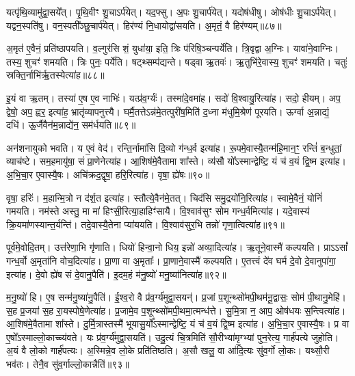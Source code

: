 यत्पृ॑थि॒व्यामु॑द्वा॒सये᳚त्। 
पृ॒थि॒वीꣳ शु॒चाऽर्प॑येत्। 
यद॒फ्सु। 
अ॒पः  शु॒चार्प॑येत्। 
यदोष॑धीषु। 
ओष॑धीः  शु॒चाऽर्प॑येत्। 
यद्वन॒स्पति॑षु। 
वन॒स्पती᳚ञ्छु॒चार्प॑येत्। 
हिर॑ण्यं नि॒धायोद्वा॑सयति। 
अ॒मृतं॒ वै हिर॑ण्यम्॥८७॥

अ॒मृत॑ ए॒वैनं॒ प्रति॑ष्ठापयति। 
व॒ल्गुर॑सि शं॒ युधा॑या॒ इति॒ त्रिः प॑रिषि॒ञ्चन्पर्ये॑ति। 
त्रि॒वृद्वा अ॒ग्निः। 
यावा॑ने॒वाग्निः। 
तस्य॒ शुचꣳ॑ शमयति। 
त्रिः पुनः॒ पर्ये॑ति। 
षट्थ्सम्प॑द्यन्ते। 
षड्वा ऋ॒तवः॑। 
ऋ॒तुभि॑रे॒वास्य॒ शुचꣳ॑ शमयति। 
चतुः॑ स्रक्ति॒र्नाभि॑र्\mbox{}ऋ॒तस्येत्या॑ह॥८८॥

इ॒यं वा ऋ॒तम्। 
तस्या॑ ए॒ष ए॒व नाभिः॑। 
यत्प्र॑व॒र्ग्यः॑। 
तस्मा॑दे॒वमा॑ह। 
सदो॑ वि॒श्वायु॒रित्या॑ह। 
सदो॒ हीयम्। 
अप॒ द्वेषो॒ अप॒ ह्वर॒ इत्या॑ह॒ भ्रातृ॑व्यापनुत्त्यै। 
घर्मै॒तत्तेऽन्न॑मे॒तत्पुरी॑ष॒मिति॑ द॒ध्ना म॑धुमि॒श्रेण॑ पूरयति। 
ऊर्ग्वा अ॒न्नाद्यं॒ दधि॑। 
ऊ॒र्जैवैन॑म॒न्नाद्ये॑न॒ सम॑र्धयति॥८९॥

अन॑शनायुको भवति। 
य ए॒वं वेद॑। 
रन्ति॒र्नामा॑सि दि॒व्यो ग॑न्ध॒र्व इत्या॑ह। 
रू॒पमे॒वास्यै॒तन्म॑हि॒मान॒ꣳ॒ रन्तिं॑ ब॒न्धुतां॒ व्याच॑ष्टे। 
सम॒हमायु॑षा॒ सं प्रा॒णेनेत्या॑ह। 
आ॒शिष॑मे॒वैतामा शा᳚स्ते। 
व्य॑सौ यो᳚ऽस्मान्द्वेष्टि॒ यं च॑ व॒यं द्वि॒ष्म इत्या॑ह। 
अ॒भि॒चा॒र ए॒वास्यै॒षः। 
अचि॑क्रद॒द्वृषा॒ हरि॒रित्या॑ह। 
वृषा॒ ह्ये॑षः॥९०॥

वृषा॒ हरिः॑। 
म॒हान्मि॒त्रो न द॑र्\mbox{}श॒त इत्या॑ह। 
स्तौत्ये॒वैन॑मे॒तत्। 
चिद॑सि समु॒द्रयो॑नि॒रित्या॑ह। 
स्वामे॒वैनं॒ योनिं॑ गमयति। 
नम॑स्ते अस्तु॒ मा मा॑ हिꣳसी॒रित्या॒हाहिꣳ॑सायै। 
वि॒श्वाव॑सुꣳ सोम गन्ध॒र्वमित्या॑ह। 
यदे॒वास्य॑ क्रि॒यमा॑ण\-स्यान्त॒र्यन्ति॑। 
तदे॒वास्यै॒तेना प्या॑ययति। 
वि॒श्वाव॑सुर॒भि तन्नो॑ गृणा॒त्वि\-त्या॑ह॥९१॥

पूर्व॑मे॒वोदि॒तम्। 
उत्त॑रेणा॒भि गृ॑णाति। 
धियो॑ हिन्वा॒नो धिय॒ इन्नो॑ अव्या॒दित्या॑ह। 
ऋ॒तूने॒वास्मै॑ कल्पयति। 
प्राऽऽसां᳚ गन्ध॒र्वो अ॒मृता॑नि वोच॒दित्या॑ह। 
प्रा॒णा वा अ॒मृताः᳚। 
प्रा॒णाने॒वास्मै॑ कल्पयति। 
ए॒तत्त्वं दे॑व घर्म दे॒वो दे॒वानुपा॑गा॒ इत्या॑ह। 
दे॒वो ह्ये॑ष सं दे॒वानु॒पैति॑। 
इ॒दम॒हं म॑नु॒ष्यो॑ मनु॒ष्या॑नित्या॑ह॥९२॥

म॒नु॒ष्यो॑ हि। 
ए॒ष सन्म॑नु॒ष्या॑नु॒पैति॑। 
ई॒श्व॒रो वै प्र॑व॒र्ग्य॑मुद्वा॒सयन्॑। 
प्र॒जां प॒शून्थ्सो॑मपी॒थम॑नू॒द्वासः॒ सोम॑ पी॒थानु॒मेहि॑। 
स॒ह प्र॒जया॑ स॒ह रा॒यस्पोषे॒णेत्या॑ह। 
प्र॒जामे॒व प॒शून्थ्सो॑मपी॒थमा॒त्मन्ध॑त्ते। 
सु॒मि॒त्रा न॒ आप॒ ओष॑धयः स॒न्त्वित्या॑ह। 
आ॒शिष॑मे॒वैतामा शा᳚स्ते। 
दु॒र्मि॒त्रास्तस्मै॑ भूयासु॒र्यो᳚ऽस्मान्द्वेष्टि॒ यं च॑ व॒यं द्वि॒ष्म इत्या॑ह। 
अ॒भि॒चा॒र ए॒वास्यै॒षः। 
प्र वा ए॒षो᳚ऽस्माल्लो॒काच्च्य॑वते। 
यः प्र॑व॒र्ग्य॑मुद्वा॒सयति॑। 
उदु॒त्यं चि॒त्रमिति॑ सौ॒रीभ्या॑मृ॒ग्भ्यां पुन॒रेत्य॒ गार्\mbox{}ह॑पत्ये जुहोति। 
अ॒यं वै लो॒को गार्\mbox{}ह॑पत्यः। 
अ॒स्मिन्ने॒व लो॒के प्रति॑तिष्ठति। 
अ॒सौ खलु॒ वा आ॑दि॒त्यः सु॑व॒र्गो लो॒कः। 
यथ्सौ॒री भव॑तः। 
तेनै॒व सु॑व॒र्गाल्लो॒कान्नैति॑॥९३॥
\anuvakamend[ब्रह्म॑णस्त्वा पर॒स्पाया॒ इत्या॑ह दधात्य॒न्वित्य॑ रक्ष॒स्वी रक्ष॑सा॒मप॑हत्यै॒ वै हिर॑ण्यमाहार्धयति॒ ह्ये॑ष गृ॑णा॒त्वित्या॑ह मनु॒ष्या॑नित्या॑हास्यै॒षो᳚ऽष्टौ च॑]

